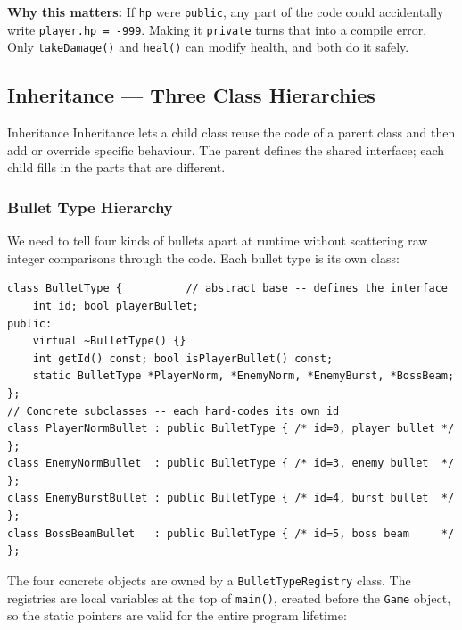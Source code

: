 \documentclass[11pt]{article}
\begin{document}
\textbf{Why this matters:} If \texttt{hp} were \texttt{public}, any part of
the code could accidentally write \texttt{player.hp = -999}. Making it
\texttt{private} turns that into a compile error. Only \texttt{takeDamage()}
and \texttt{heal()} can modify health, and both do it safely.

\subsection{Inheritance --- Three Class Hierarchies}

\begin{conceptbox}{Inheritance}
Inheritance lets a child class reuse the code of a parent class and then add
or override specific behaviour. The parent defines the shared interface; each
child fills in the parts that are different.
\end{conceptbox}

\subsubsection{Bullet Type Hierarchy}

We need to tell four kinds of bullets apart at runtime without scattering
raw integer comparisons through the code. Each bullet type is its own class:

\begin{lstlisting}[caption={BulletType hierarchy skeleton (BulletType.h)}]
class BulletType {          // abstract base -- defines the interface
    int id; bool playerBullet;
public:
    virtual ~BulletType() {}
    int getId() const; bool isPlayerBullet() const;
    static BulletType *PlayerNorm, *EnemyNorm, *EnemyBurst, *BossBeam;
};
// Concrete subclasses -- each hard-codes its own id
class PlayerNormBullet : public BulletType { /* id=0, player bullet */ };
class EnemyNormBullet  : public BulletType { /* id=3, enemy bullet  */ };
class EnemyBurstBullet : public BulletType { /* id=4, burst bullet  */ };
class BossBeamBullet   : public BulletType { /* id=5, boss beam     */ };
\end{lstlisting}

The four concrete objects are owned by a \texttt{BulletTypeRegistry} class.
The registries are local variables at the top of \texttt{main()}, created
before the \texttt{Game} object, so the static pointers are valid for the entire
program lifetime:
\end{document}
